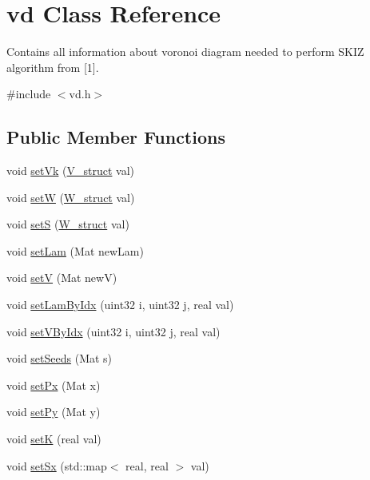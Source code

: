 \hypertarget{classvd}{}\section{vd Class Reference}
\label{classvd}


Contains all information about voronoi diagram needed to perform S\+K\+IZ algorithm from \mbox{[}1\mbox{]}.  




{\ttfamily \#include $<$vd.\+h$>$}

\subsection*{Public Member Functions}
\begin{DoxyCompactItemize}
\item 
void \mbox{\hyperlink{classvd_a062d265bd642352d6f7e8cc8685ed7a8}{set\+Vk}} (\mbox{\hyperlink{structV__struct}{V\+\_\+struct}} val)
\item 
void \mbox{\hyperlink{classvd_a85ee3a096c181f76d15f4b7fcf137fe7}{setW}} (\mbox{\hyperlink{structW__struct}{W\+\_\+struct}} val)
\item 
void \mbox{\hyperlink{classvd_a0b4c53a592ec499899a37c2e6364806a}{setS}} (\mbox{\hyperlink{structW__struct}{W\+\_\+struct}} val)
\item 
void \mbox{\hyperlink{classvd_ae13e9e465d08425218bd8f85ce420c05}{set\+Lam}} (Mat new\+Lam)
\item 
void \mbox{\hyperlink{classvd_a33e792915ebd0295a3475fe686b41ee9}{setV}} (Mat newV)
\item 
void \mbox{\hyperlink{classvd_a8df228a05762e0c0a2bccc28094a1f92}{set\+Lam\+By\+Idx}} (uint32 i, uint32 j, real val)
\item 
void \mbox{\hyperlink{classvd_a29670919bb8d5b2f2f0235ddfda6484e}{set\+V\+By\+Idx}} (uint32 i, uint32 j, real val)
\item 
void \mbox{\hyperlink{classvd_a739318bbb45d4facfcc1899c71b91720}{set\+Seeds}} (Mat s)
\item 
void \mbox{\hyperlink{classvd_a579df0c885a43bb876449889bbcba6cb}{set\+Px}} (Mat x)
\item 
void \mbox{\hyperlink{classvd_a8314de29eacf72f10afee2c67b0c9819}{set\+Py}} (Mat y)
\item 
void \mbox{\hyperlink{classvd_a7c692a97b49c4596c4ec1bc0a129b516}{setK}} (real val)
\item 
void \mbox{\hyperlink{classvd_afb492f7d32ff2a4d54bd531d57d66a1a}{set\+Sx}} (std\+::map$<$ real, real $>$ val)

\end{DoxyCompactItemize}
